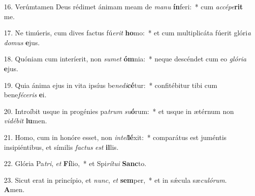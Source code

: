 16. Verúmtamen Deus rédimet ánimam meam de \textit{ma}\textit{nu} \textbf{ín}feri:~*  cum \textit{ac}\textit{cé}\textit{pe}\textbf{rit} me.\

17. Ne timúeris, cum dives factus fú\textit{e}\textit{rit} \textbf{ho}mo:~*  et cum multiplicáta fúerit glóri\textit{a} \textit{do}\textit{mus} \textbf{e}jus.\

18. Quóniam cum interíerit, non \textit{su}\textit{met} \textbf{óm}nia:~*  neque descéndet cum eo \textit{gló}\textit{ri}\textit{a} \textbf{e}jus.\

19. Quia ánima ejus in vita ipsíus be\textit{ne}\textit{di}\textbf{cé}tur:~*  confitébitur tibi cum bene\textit{fé}\textit{ce}\textit{ris} \textbf{e}i.\

20. Introíbit usque in progénies pa\textit{trum} \textit{su}\textbf{ó}rum:~*  et usque in ætérnum non \textit{vi}\textit{dé}\textit{bit} \textbf{lu}men.\

21. Homo, cum in honóre esset, non \textit{in}\textit{tel}\textbf{lé}xit:~*  comparátus est juméntis insipiéntibus, et símilis \textit{fac}\textit{tus} \textit{est} \textbf{il}lis.\

22. Glória Pa\textit{tri}, \textit{et} \textbf{Fí}lio,~*  et Spi\textit{rí}\textit{tu}\textit{i} \textbf{Sanc}to.\

23. Sicut erat in princípio, et \textit{nunc}, \textit{et} \textbf{sem}per,~*  et in sǽcula sæ\textit{cu}\textit{ló}\textit{rum}. \textbf{A}men.\

